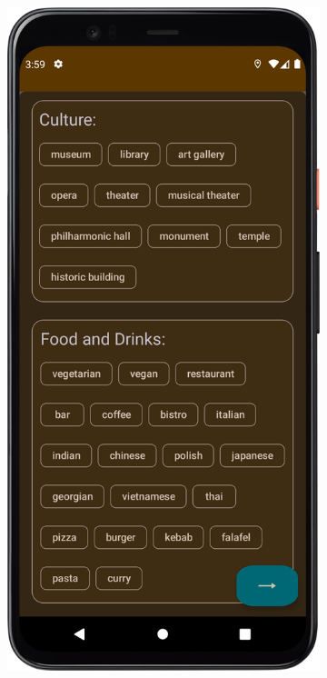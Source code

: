         \begin{figure}[H]%
            \centering
            \begin{subfigure}[b]{0.3\textwidth}
                \centering
                \includegraphics[width=\textwidth]{src/app/tags_unselected.png}

\end{subfigure}
\end{figure}
